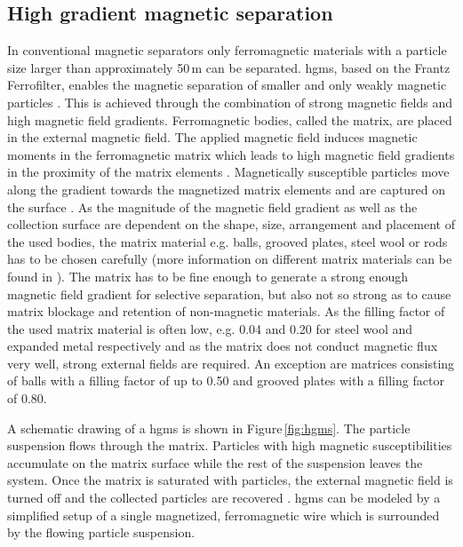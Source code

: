 \subsection{High gradient magnetic separation}
\label{subsec:HGMS}
In conventional magnetic separators only ferromagnetic materials with a particle size larger than approximately 50\,\textmu m can be separated. \Gls{hgms}, based on the Frantz Ferrofilter, enables the magnetic separation of smaller and only weakly magnetic particles \cite{frantz1937patent,ge2017magnetic}. This is achieved through the combination of strong magnetic fields and high magnetic field gradients. Ferromagnetic bodies, called the matrix, are placed in the external magnetic field. The applied magnetic field induces magnetic moments in the ferromagnetic matrix which leads to high magnetic field gradients in the proximity of the matrix elements \cite{shukla2006process}. Magnetically susceptible particles move along the gradient towards the magnetized matrix elements and are captured on the surface \cite{hoffmann2002novel}. As the magnitude of the magnetic field gradient as well as the collection surface are dependent on the shape, size, arrangement and placement of the used bodies, the matrix material e.g. balls, grooved plates, steel wool or rods has to be chosen carefully (more information on different matrix materials can be found in \cite{iacob2002high,kim2013effects,takayasu1981matrices}). The matrix has to be fine enough to generate a strong enough magnetic field gradient for selective separation, but also not so strong as to cause matrix blockage and retention of non-magnetic materials. As the filling factor of the used matrix material is often low, e.g. 0.04 and 0.20 for steel wool and expanded metal respectively and as the matrix does not conduct magnetic flux very well, strong external fields are required. An exception are matrices consisting of balls with a filling factor of up to 0.50 and grooved plates with a filling factor of 0.80. 

A schematic drawing of a \gls{hgms} is shown in Figure\,\ref{fig:hgms}. The particle suspension flows through the matrix. Particles with high magnetic susceptibilities accumulate on the matrix surface while the rest of the suspension leaves the system. Once the matrix is saturated with particles, the external magnetic field is turned off and the collected particles are recovered \cite{svoboda2004magnetic,gerber1983high,ditsch2005high}. \gls{hgms} can be modeled by a simplified setup of a single magnetized, ferromagnetic wire which is surrounded by the flowing particle suspension. %


